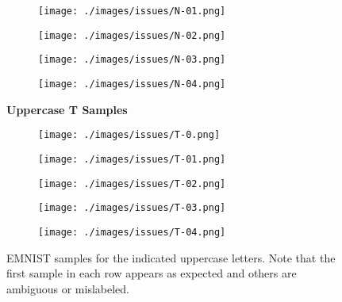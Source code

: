 \begin{figure}[H]
\begin{subfigure}{.10\textwidth}
        \label{fig:issue_N0}
    \end{subfigure}%
    \begin{subfigure}{.10\textwidth}
        \centering
        \texttt{[image: ./images/issues/N-01.png]}
        \label{fig:issue_N01}
    \end{subfigure}%
    \begin{subfigure}{.10\textwidth}
        \centering
        \texttt{[image: ./images/issues/N-02.png]}
        \label{fig:issue_N02}
    \end{subfigure}%
    \begin{subfigure}{.10\textwidth}
        \centering
        \texttt{[image: ./images/issues/N-03.png]}
        \label{fig:issue_N03}
    \end{subfigure}%
    \begin{subfigure}{.10\textwidth}
        \centering
        \texttt{[image: ./images/issues/N-04.png]}
        \label{fig:issue_N04}
    \end{subfigure}\par\medskip
    \textbf{Uppercase T Samples}\par\medskip
    \begin{subfigure}{.10\textwidth}
        \centering
        \texttt{[image: ./images/issues/T-0.png]}
        \label{fig:issue_T0}
    \end{subfigure}%
    \begin{subfigure}{.10\textwidth}
        \centering
        \texttt{[image: ./images/issues/T-01.png]}
        \label{fig:issue_T01}
    \end{subfigure}%
    \begin{subfigure}{.10\textwidth}
        \centering
        \texttt{[image: ./images/issues/T-02.png]}
        \label{fig:issue_T02}
    \end{subfigure}%
    \begin{subfigure}{.10\textwidth}
        \centering
        \texttt{[image: ./images/issues/T-03.png]}
        \label{fig:issue_T03}
    \end{subfigure}%
    \begin{subfigure}{.10\textwidth}
        \centering
        \texttt{[image: ./images/issues/T-04.png]}
        \label{fig:issue_T04}
    \end{subfigure}
    \caption{EMNIST samples for the indicated uppercase letters.  Note that the first sample in each row appears as expected and others are ambiguous or mislabeled.}
    \label{fig:emnist_label_errors}
\end{figure}

